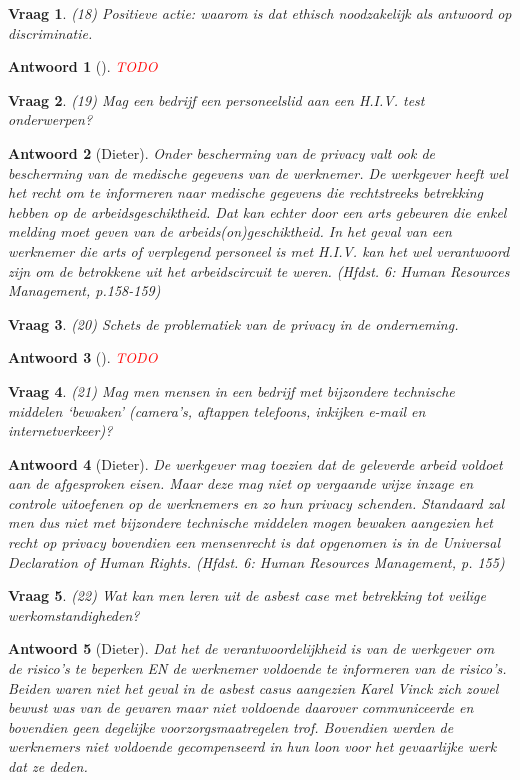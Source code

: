 \documentclass{article}
\theoremstyle{nonumberplain}
\newtheorem{question}{Vraag}
\newtheorem{answer}{Antwoord}
\begin{document}
\begin{question}
(18)	Positieve actie: waarom is dat ethisch noodzakelijk als antwoord op discriminatie.
\end{question}
\begin{answer}[]
\textcolor{red}{TODO}%
\end{answer}

\begin{question}
(19)	Mag een bedrijf een personeelslid aan een H.I.V. test onderwerpen? 
\end{question}
\begin{answer}[Dieter]
	Onder bescherming van de privacy valt ook de bescherming van de medische gegevens van de werknemer.
	De werkgever heeft wel het recht om te informeren naar medische gegevens die rechtstreeks betrekking hebben op de arbeidsgeschiktheid.
	Dat kan echter door een arts gebeuren die enkel melding moet geven van de arbeids(on)geschiktheid.
	In het geval van een werknemer die arts of verplegend personeel is met H.I.V. kan het wel verantwoord zijn om de betrokkene uit het arbeidscircuit te weren.
	\textit{(Hfdst. 6: Human Resources Management, p.158-159)}
\end{answer}

\begin{question}
(20)	Schets de problematiek van de privacy in de onderneming.
\end{question}
\begin{answer}[]
\textcolor{red}{TODO}%
\end{answer}

\begin{question}
(21)	Mag men mensen in een bedrijf met bijzondere technische middelen `bewaken' (camera's, aftappen telefoons, inkijken e-mail en internetverkeer)?
\end{question}
\begin{answer}[Dieter]
	De werkgever mag toezien dat de geleverde arbeid voldoet aan de afgesproken eisen.
	Maar deze mag niet op vergaande wijze inzage en controle uitoefenen op de werknemers en zo hun privacy schenden.
	Standaard zal men dus niet met bijzondere technische middelen mogen bewaken aangezien het recht op privacy bovendien een mensenrecht is dat opgenomen is in de \emph{Universal Declaration of Human Rights}.
	\textit{(Hfdst. 6: Human Resources Management, p. 155)}
\end{answer}

\begin{question}
(22)	Wat kan men leren uit de asbest case met betrekking tot veilige werkomstandigheden? 
\end{question}
\begin{answer}[Dieter]
	Dat het de verantwoordelijkheid is van de werkgever om de risico's te beperken EN de werknemer voldoende te informeren van de risico's.
	Beiden waren niet het geval in de asbest casus aangezien Karel Vinck zich zowel bewust was van de gevaren maar niet voldoende daarover communiceerde en bovendien geen degelijke voorzorgsmaatregelen trof.
	Bovendien werden de werknemers niet voldoende gecompenseerd in hun loon voor het gevaarlijke werk dat ze deden.
\end{answer}
\end{document}

